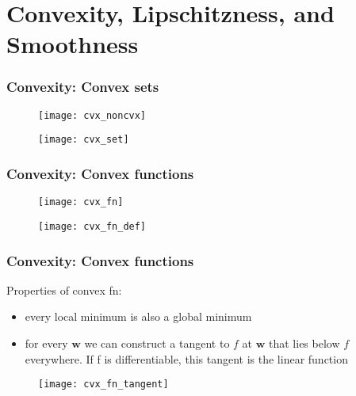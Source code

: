 \section{Convexity, Lipschitzness, and Smoothness}

\begin{frame}
\frametitle{Convexity: Convex sets}

\begin{figure}
    \centering
    \texttt{[image: cvx\_noncvx]}
\end{figure}

\begin{figure}
    \centering
    \texttt{[image: cvx\_set]}
\end{figure}

\end{frame}

\begin{frame}
\frametitle{Convexity: Convex functions}

\begin{figure}
    \centering
    \texttt{[image: cvx\_fn]}
\end{figure}

\begin{figure}
    \centering
    \texttt{[image: cvx\_fn\_def]}
\end{figure}

\end{frame}

\begin{frame}
\frametitle{Convexity: Convex functions}

Properties of convex fn:
\begin{itemize}
    \item  every local minimum is also a global minimum
    \item  for every $\mathbf{w}$ we can construct a tangent to $f$
    at $\mathbf{w}$ that lies below $f$ everywhere.
    If f is differentiable, this tangent is the linear function
\end{itemize}

\begin{figure}
    \centering
    \texttt{[image: cvx\_fn\_tangent]}
\end{figure}

\end{frame}


